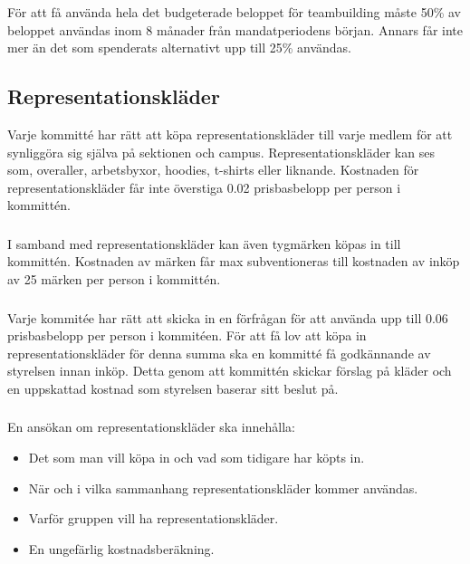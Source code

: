 \documentclass[a4paper, 10pt]{article}
\begin{document}
\subsubsection{}
För att få använda hela det budgeterade beloppet för teambuilding måste 50\% av beloppet användas inom 8 månader från mandatperiodens början. Annars får inte mer än det som spenderats alternativt upp till 25\% användas.

\subsection{Representationskläder}
Varje kommitté har rätt att köpa representationskläder till varje medlem för att synliggöra sig själva på sektionen och campus. Representationskläder kan ses som, overaller, arbetsbyxor, hoodies, t-shirts eller liknande. Kostnaden för representationskläder får inte överstiga 0.02 prisbasbelopp per person i kommittén.

\subsubsection{}
I samband med representationskläder kan även tygmärken köpas in till kommittén. Kostnaden av märken får max subventioneras till kostnaden av inköp av 25 märken per person i kommittén.
\subsubsection{}
Varje kommitée har rätt att skicka in en förfrågan för att använda upp till 0.06 prisbasbelopp per person i kommitéen. För att få lov att köpa in representationskläder för denna summa ska en kommitté få godkännande av styrelsen innan inköp. Detta genom att kommittén skickar förslag på kläder och en uppskattad kostnad som styrelsen baserar sitt beslut på.

\subsubsection{}
En ansökan om representationskläder ska innehålla:
\begin{itemize}
  \item Det som man vill köpa in och vad som tidigare har köpts in.
  \item När och i vilka sammanhang representationskläder kommer användas.
  \item Varför gruppen vill ha representationskläder.
  \item En ungefärlig kostnadsberäkning.
\end{itemize}
\end{document}
